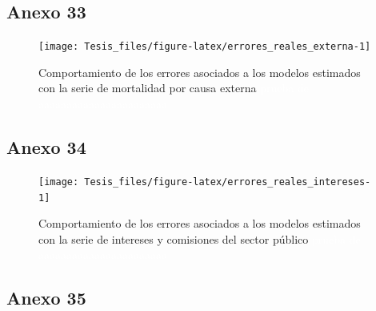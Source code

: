 \documentclass[
]{article}
\begin{document}
\subsection{Anexo 33}

\begin{figure}[H]
\texttt{[image: Tesis\_files/figure-latex/errores\_reales\_externa-1]} \caption{Comportamiento de los errores asociados a los modelos estimados con la serie de mortalidad por causa externa \textcolor{white}{prueba de aaaaaaaaaaaaaaaaaaaaaaa}}\label{fig:errores_reales_externa}
\end{figure}

\subsection{Anexo 34}

\begin{figure}[H]
\texttt{[image: Tesis\_files/figure-latex/errores\_reales\_intereses-1]} \caption{Comportamiento de los errores asociados a los modelos estimados con la serie de intereses y comisiones del sector público \textcolor{white}{prueba de aaaaaaaaaaaaaaaaaaaaaaa}}\label{fig:errores_reales_intereses}
\end{figure}

\subsection{Anexo 35}
\end{document}
